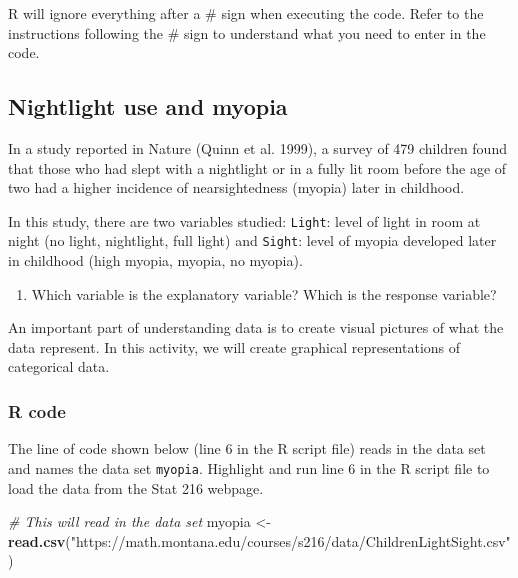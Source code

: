 \documentclass[
]{report}
\newenvironment{Shaded}{\begin{snugshade}}{\end{snugshade}}
\newcommand{\CommentTok}[1]{\textcolor[rgb]{0.56,0.35,0.01}{\textit{#1}}}
\newcommand{\FunctionTok}[1]{\textcolor[rgb]{0.13,0.29,0.53}{\textbf{#1}}}
\newcommand{\NormalTok}[1]{#1}
\newcommand{\OtherTok}[1]{\textcolor[rgb]{0.56,0.35,0.01}{#1}}
\newcommand{\StringTok}[1]{\textcolor[rgb]{0.31,0.60,0.02}{#1}}
\providecommand{\tightlist}{%
  \setlength{\itemsep}{0pt}\setlength{\parskip}{0pt}}
\begin{document}
R will ignore everything after a \# sign when executing the code. Refer to the instructions following the \# sign to understand what you need to enter in the code.

\subsection*{Nightlight use and myopia}\label{nightlight-use-and-myopia}

In a study reported in Nature (Quinn et al. 1999), a survey of 479 children found that those who had slept with a nightlight or in a fully lit room before the age of two had a higher incidence of nearsightedness (myopia) later in childhood.

In this study, there are two variables studied: \texttt{Light}: level of light in room at night (no light, nightlight, full light) and \texttt{Sight}: level of myopia developed later in childhood (high myopia, myopia, no myopia).

\begin{enumerate}
\def\labelenumi{\arabic{enumi}.}
\tightlist
\item
  Which variable is the explanatory variable? Which is the response variable?
\end{enumerate}

\vspace{0.8in}

An important part of understanding data is to create visual pictures of what the data represent. In this activity, we will create graphical representations of categorical data.

\subsubsection*{R code}\label{r-code}

The line of code shown below (line 6 in the R script file) reads in the data set and names the data set \texttt{myopia}. Highlight and run line 6 in the R script file to load the data from the Stat 216 webpage.

\begin{Shaded}
\begin{Highlighting}[]
\CommentTok{\# This will read in the data set}
\NormalTok{myopia }\OtherTok{\textless{}{-}} \FunctionTok{read.csv}\NormalTok{(}\StringTok{"https://math.montana.edu/courses/s216/data/ChildrenLightSight.csv"}\NormalTok{) }
\end{Highlighting}
\end{Shaded}
\end{document}

